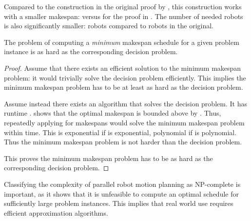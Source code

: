 Compared to the construction in the original proof by \cite{siamcomp/DemaineFKMS19}, this construction works with a smaller makespan:  versus  for the proof in \cite{siamcomp/DemaineFKMS19}. The number of needed robots is also significantly smaller:  robots compared to  robots in the original. 

\begin{corollary}
	The problem of computing a \emph{minimum} makespan schedule for a given problem instance is as hard as the corresponding decision problem. 
\end{corollary}

\begin{proof}
	Assume that there exists an efficient solution to the minimum makespan problem: it would trivially solve the decision problem efficiently. This implies the minimum makespan problem has to be at least as hard as the decision problem. 

	
	Assume instead there exists an algorithm  that solves the decision problem. It has runtime . \cite{siamcomp/DemaineFKMS19} shows that the optimal makespan is bounded above by . Thus, repeatedly applying  for makespans  would solve the minimum makespan problem within  time. This is exponential if  is exponential, polynomial if  is polynomial. Thus the minimum makespan problem is not harder than the decision problem. 

	This proves the minimum makespan problem has to be as hard as the corresponding decision problem.
\end{proof} 

Classifying the complexity of parallel robot motion planning as NP-complete is important, as it shows that it is unfeasible to compute an optimal schedule for sufficiently large problem instances. This implies that real world use requires efficient approximation algorithms.



